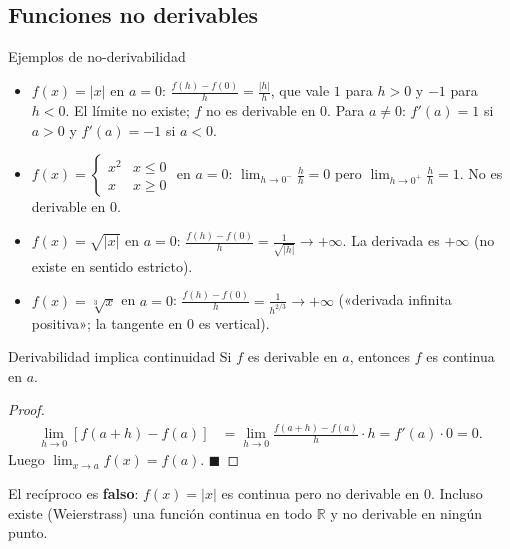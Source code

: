\documentclass[12pt]{article}
\begin{document}
\subsection{Funciones no derivables}

\begin{observacion}[]{Ejemplos de no-derivabilidad}
\begin{itemize}
  \item $f(x) = |x|$ en $a=0$: $\displaystyle\frac{f(h)-f(0)}{h} = \frac{|h|}{h}$, que vale $1$ para $h>0$ y $-1$ para $h<0$. El límite no existe; $f$ no es derivable en $0$.
  Para $a\neq 0$: $f'(a) = 1$ si $a>0$ y $f'(a)=-1$ si $a<0$.

  \item $f(x) = \begin{cases}x^2 & x\leq 0 \\ x & x\geq 0\end{cases}$ en $a=0$:
  $\displaystyle\lim_{h\to 0^-}\frac{h}{h}=0$ pero $\displaystyle\lim_{h\to 0^+}\frac{h}{h}=1$. No es derivable en $0$.

  \item $f(x) = \sqrt{|x|}$ en $a=0$: $\displaystyle\frac{f(h)-f(0)}{h} = \frac{1}{\sqrt{|h|}} \to +\infty$. La derivada es $+\infty$ (no existe en sentido estricto).

  \item $f(x) = \sqrt[3]{x}$ en $a=0$: $\displaystyle\frac{f(h)-f(0)}{h} = \frac{1}{h^{2/3}} \to +\infty$ («derivada infinita positiva»; la tangente en $0$ es vertical).
\end{itemize}
\end{observacion}

\begin{teorema}[1]{Derivabilidad implica continuidad}
Si $f$ es derivable en $a$, entonces $f$ es continua en $a$.
\end{teorema}

\begin{proof}
\begin{align*}
\lim_{h\to 0}[f(a+h)-f(a)] &= \lim_{h\to 0}\frac{f(a+h)-f(a)}{h}\cdot h = f'(a)\cdot 0 = 0.
\end{align*}
Luego $\lim_{x\to a}f(x) = f(a)$.
$\blacksquare$
\end{proof}

\begin{nota}[]{}
El recíproco es \textbf{falso}: $f(x) = |x|$ es continua pero no derivable en $0$. Incluso existe (Weierstrass) una función continua en todo $\mathbb{R}$ y no derivable en ningún punto.
\end{nota}
\end{document}
